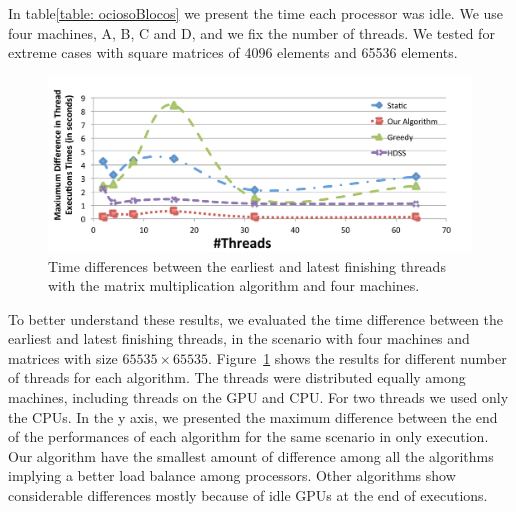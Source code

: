 \documentclass[journal]{IEEEtran}
\begin{document}
In table\ref{table: ociosoBlocos} we present the time each processor was idle. We use four machines, A, B, C and D, and we fix the number of threads. We tested for extreme cases with square matrices of 4096 elements and 65536 elements.


\begin{figure}[htb]
	\begin{center}
	\centering
			\includegraphics[scale=0.33]{MaximoDiferenca_matrix_novo.pdf}
	\caption{Time differences between the earliest and latest finishing
          threads with the matrix multiplication algorithm and four machines.}
	\label{fig:diferencaThreads}
	\end{center}
\end{figure}


%	

To better understand these results, we evaluated the time difference between the
earliest and latest finishing threads, in the scenario with four machines and
matrices with size $65535 \times 65535$.  Figure~\ref{fig:diferencaThreads}
shows the results for different number of threads for each algorithm. The
threads were distributed equally among machines, including threads on the GPU
and CPU. For two threads we used only the CPUs. In the y axis, we presented the
maximum difference between the end of the performances of each algorithm for the
same scenario in only execution. Our algorithm have the smallest amount of difference among all
the algorithms implying a better load balance among processors. Other algorithms
show considerable differences mostly because of idle GPUs at the end of
executions.
\end{document}
